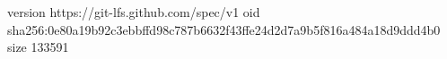version https://git-lfs.github.com/spec/v1
oid sha256:0e80a19b92c3ebbffd98c787b6632f43ffe24d2d7a9b5f816a484a18d9ddd4b0
size 133591
